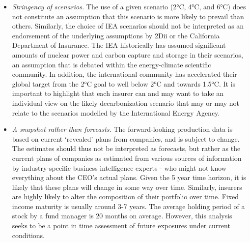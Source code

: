 \documentclass[10pt,table,a4]{article}\usepackage[]{graphicx}\usepackage[]{color}
\begin{document}
	\begin{multicols}{2}
		\begin{itemize}
			\item{\textit{Stringency of scenarios.} The use of a given scenario (2°C, 4°C, and 6°C) does not constitute an assumption that this scenario is more likely to prevail than others. Similarly, the choice of IEA scenarios should not be interpreted as an endorsement of the underlying assumptions by 2Dii or the California Department of Insurance. The IEA historically has assumed significant amounts of nuclear power and carbon capture and storage in their scenarios, an assumption that is debated within the energy-climate scientific community. In addition, the international community has accelerated their global target from the 2°C goal to well below 2°C and towards 1.5°C. It is important to highlight that each insurer can and may want to take an individual view on the likely decarbonization scenario that may or may not relate to the scenarios modelled by the International Energy Agency.}
			
			\item{\textit{A snapshot rather than forecasts.} The forward-looking production data is based on current `revealed' plans from companies, and is subject to change. The estimates should thus not be interpreted as forecasts, but rather as the current plans of companies as estimated from various sources of information by industry-specific business intelligence experts - who might not know everything about the CEO's actual plans. Given the 5 year time horizon, it is likely that these plans will change in some way over time. Similarly, insurers are highly likely to alter the composition of their portfolio over time. Fixed income maturity is usually around 3-7 years. The average holding period of a stock by a fund manager is 20 months on average. However, this analysis seeks to be a point in time assessment of future exposures under current conditions.}
			

\end{itemize}
\end{multicols}
\end{document}
